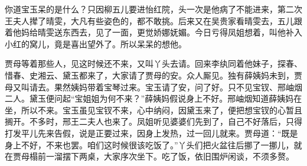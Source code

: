 \begin{parag}
    你道宝玉呆的是什么？只因柳五儿要进怡红院，头一次是他病了不能进来，第二次王夫人撵了晴雯，大凡有些姿色的，都不敢挑。后来又在吴贵家看晴雯去，五儿跟着他妈给晴雯送东西去，见了一面，更觉娇娜妩媚。今日亏得凤姐想着，叫他补入小红的窝儿，竟是喜出望外了。所以呆呆的想他。
\end{parag}


\begin{parag}
    贾母等着那些人，见这时候还不来，又叫丫头去请。回来李纨同着他妹子，探春、惜春、史湘云、黛玉都来了，大家请了贾母的安。众人厮见。独有薛姨妈未到，贾母又叫请去。果然姨妈带着宝琴过来。宝玉请了安，问了好。只不见宝钗、邢岫烟二人。黛玉便问起“宝姐姐为何不来？”薛姨妈假说身上不好。邢岫烟知道薛姨妈在坐，所以不来。宝玉虽见宝钗不来，心中纳闷，因黛玉来了，便把想宝钗的心暂且搁开。不多时，邢王二夫人也来了。凤姐听见婆婆们先到了，自己不好落后，只得打发平儿先来告假，说是正要过来，因身上发热，过一回儿就来。贾母道：“既是身上不好，不来也罢。咱们这时候很该吃饭了。”丫头们把火盆往后挪了一挪儿，就在贾母榻前一溜摆下两桌，大家序次坐下。吃了饭，依旧围炉闲谈，不须多赘。
\end{parag}


